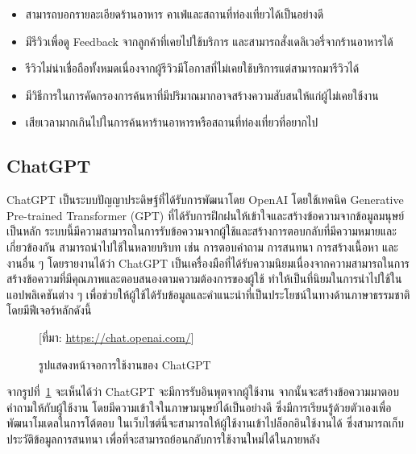 \documentclass[12pt,oneside,openright,a4paper]{cpe-thai-project}
\begin{document}
\begin{itemize}
\item สามารถบอกรายละเอียดร้านอาหาร คาเฟ่และสถานที่ท่องเที่ยวได้เป็นอย่างดี
\item มีรีวิวเพื่อดู Feedback จากลูกค้าที่เคยไปใช้บริการ และสามารถสั่งเดลิเวอรี่จากร้านอาหารได้
\end{itemize}
\begin{itemize}
\item รีวิวไม่น่าเชื่อถือทั้งหมดเนื่องจากผู้รีวิวมีโอกาสที่ไม่เคยใช้บริการแต่สามารถมารีวิวได้
\item มีวิธีการในการคัดกรองการค้นหาที่มีปริมาณมากอาจสร้างความสับสนให้แก่ผู้ไม่เคยใช้งาน
\item เสียเวลามากเกินไปในการค้นหาร้านอาหารหรือสถานที่ท่องเที่ยวที่อยากไป
\end{itemize}

\subsection{ChatGPT}
ChatGPT \cite{chatgpt} เป็นระบบปัญญาประดิษฐ์ที่ได้รับการพัฒนาโดย OpenAI โดยใช้เทคนิค Generative Pre-trained Transformer (GPT) ที่ได้รับการฝึกฝนให้เข้าใจและสร้างข้อความจากข้อมูลมนุษย์เป็นหลัก ระบบนี้มีความสามารถในการรับข้อความจากผู้ใช้และสร้างการตอบกลับที่มีความหมายและเกี่ยวข้องกัน สามารถนำไปใช้ในหลายบริบท เช่น การตอบคำถาม การสนทนา การสร้างเนื้อหา และงานอื่น ๆ โดยรายงานได้ว่า ChatGPT เป็นเครื่องมือที่ได้รับความนิยมเนื่องจากความสามารถในการสร้างข้อความที่มีคุณภาพและตอบสนองตามความต้องการของผู้ใช้ ทำให้เป็นที่นิยมในการนำไปใช้ในแอปพลิเคชันต่าง ๆ เพื่อช่วยให้ผู้ใช้ได้รับข้อมูลและคำแนะนำที่เป็นประโยชน์ในทางด้านภาษาธรรมชาติ โดยมีฟีเจอร์หลักดังนี้ \newpage

\begin{figure}[!h]\centering
\setlength{\fboxrule}{0.1mm}
\caption{รูปแสดงหน้าจอการใช้งานของ ChatGPT}\label{fig:F2.7}
[ที่มา: \href{https://chat.openai.com/} {https://chat.openai.com/}]
\end{figure}
จากรูปที่~\ref{fig:F2.7} จะเห็นได้ว่า ChatGPT จะมีการรับอินพุตจากผู้ใช้งาน จากนั้นจะสร้างข้อความมาตอบคำถามให้กับผู้ใช้งาน โดยมีความเข้าใจในภาษามนุษย์ได้เป็นอย่างดี ซึ่งมีการเรียนรู้ด้วยตัวเองเพื่อพัฒนาโมเดลในการโต้ตอบ ในเว็บไซต์นี้จะสามารถให้ผู้ใช้งานเข้าไปล็อกอินใช้งานได้ ซึ่งสามารถเก็บประวัติข้อมูลการสนทนา เพื่อที่จะสามารถย้อนกลับการใช้งานใหม่ได้ในภายหลัง \\
\end{document}
